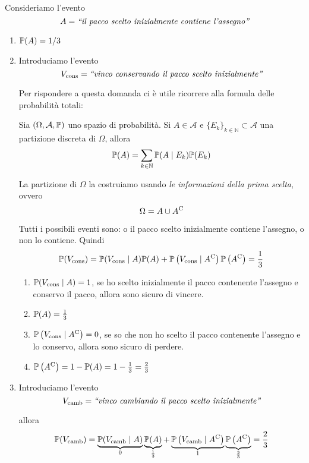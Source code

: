 Consideriamo l'evento
\begin{equation*}
	A=\emph{``il pacco scelto inizialmente contiene l'assegno''}
\end{equation*}
\begin{enumerate}
	\item $\mathbb{P}(A) =1/3$
	\item Introduciamo l'evento
	\begin{equation*}
	V_{\text{cons}} =\emph{``vinco conservando il pacco scelto inizialmente''}
	\end{equation*}

	Per rispondere a questa domanda ci è utile ricorrere alla formula delle probabilità totali:\begin{thm}
	Sia $(\Omega ,\mathcal{A} ,\mathbb{P})$ uno spazio di probabilità. Si $A\in \mathcal{A}$ e $\{E_{k}\}_{k\in \mathbb{N}} \subset \mathcal{A}$ una partizione discreta di $\Omega $, allora
	\begin{equation*}
	\mathbb{P}(A) =\sum\limits _{k\in \mathbb{N}}\mathbb{P}(A\mid E_{k})\mathbb{P}(E_{k})
	\end{equation*}
	\end{thm}

	La partizione di $\Omega $ la costruiamo usando \textit{le informazioni della prima scelta}, ovvero
	\begin{equation*}
	\Omega =A\cup A^{\mathrm{C}}
	\end{equation*}

	Tutti i possibili eventi sono: o il pacco scelto inizialmente contiene l'assegno, o non lo contiene. Quindi
	\begin{equation*}
	\mathbb{P}(V_{\text{cons}}) =\mathbb{P}(V_{\text{cons}} \mid A)\mathbb{P}(A) +\mathbb{P}\left(V_{\text{cons}} \mid A^{\mathrm{C}}\right)\mathbb{P}\left(A^{\mathrm{C}}\right) =\frac{1}{3}
	\end{equation*}
	\begin{enumerate}
	\item $\mathbb{P}(V_{\text{cons}} \mid A) =1$, se ho scelto inizialmente il pacco contenente l'assegno e conservo il pacco, allora sono sicuro di vincere.
	\item $\mathbb{P}(A) =\frac{1}{3}$
	\item $\mathbb{P}\left(V_{\text{cons}} \mid A^{\mathrm{C}}\right) =0$, se so che non ho scelto il pacco contenente l'assegno e lo conservo, allora sono sicuro di perdere.
	\item $\mathbb{P}\left(A^{\mathrm{C}}\right) =1-\mathbb{P}(A) =1-\frac{1}{3} =\frac{2}{3}$
	\end{enumerate}
	\item Introduciamo l'evento
	\begin{equation*}
	V_{\text{camb}} =\emph{``vinco cambiando il pacco scelto inizialmente''}
	\end{equation*}

	allora
	\begin{equation*}
	\mathbb{P}(V_{\text{camb}}) =\underbrace{\mathbb{P}(V_{\text{camb}} \mid A)}_{0}\underbrace{\mathbb{P}(A)}_{\frac{1}{3}} +\underbrace{\mathbb{P}\left(V_{\text{camb}} \mid A^{\mathrm{C}}\right)}_{1}\underbrace{\mathbb{P}\left(A^{\mathrm{C}}\right)}_{\frac{2}{3}} =\frac{2}{3}
	\end{equation*}
\end{enumerate}

